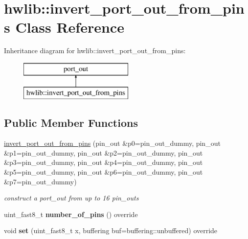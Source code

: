 \hypertarget{classhwlib_1_1invert__port__out__from__pins}{}\section{hwlib\+:\+:invert\+\_\+port\+\_\+out\+\_\+from\+\_\+pins Class Reference}
\label{classhwlib_1_1invert__port__out__from__pins}
Inheritance diagram for hwlib\+:\+:invert\+\_\+port\+\_\+out\+\_\+from\+\_\+pins\+:\begin{figure}[H]
\begin{center}
\leavevmode
\includegraphics[height=2.000000cm]{classhwlib_1_1invert__port__out__from__pins}
\end{center}
\end{figure}
\subsection*{Public Member Functions}
\begin{DoxyCompactItemize}
\item 
\hyperlink{classhwlib_1_1invert__port__out__from__pins_a2eae53fe915f8e09ab5d66594d79ef29}{invert\+\_\+port\+\_\+out\+\_\+from\+\_\+pins} (pin\+\_\+out \&p0=pin\+\_\+out\+\_\+dummy, pin\+\_\+out \&p1=pin\+\_\+out\+\_\+dummy, pin\+\_\+out \&p2=pin\+\_\+out\+\_\+dummy, pin\+\_\+out \&p3=pin\+\_\+out\+\_\+dummy, pin\+\_\+out \&p4=pin\+\_\+out\+\_\+dummy, pin\+\_\+out \&p5=pin\+\_\+out\+\_\+dummy, pin\+\_\+out \&p6=pin\+\_\+out\+\_\+dummy, pin\+\_\+out \&p7=pin\+\_\+out\+\_\+dummy)
\begin{DoxyCompactList}\small\item\em construct a port\+\_\+out from up to 16 pin\+\_\+outs \end{DoxyCompactList}\item 
\mbox{\label{classhwlib_1_1invert__port__out__from__pins_a4337f4b89402a5cf359d682cecdeb349}} 
uint\+\_\+fast8\+\_\+t {\bfseries number\+\_\+of\+\_\+pins} () override
\item 
\mbox{\label{classhwlib_1_1invert__port__out__from__pins_a05fbc97458115a8413dc2739449d755f}} 
void {\bfseries set} (uint\+\_\+fast8\+\_\+t x, buffering buf=buffering\+::unbuffered) override
\end{DoxyCompactItemize}


